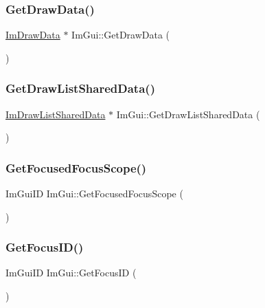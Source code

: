 \subsubsection{\texorpdfstring{Get\+Draw\+Data()}{GetDrawData()}}
{\footnotesize\ttfamily \hyperlink{structImDrawData}{Im\+Draw\+Data} $\ast$ Im\+Gui\+::\+Get\+Draw\+Data (\begin{DoxyParamCaption}{ }\end{DoxyParamCaption})}

\mbox{\label{namespaceImGui_a2a5a77bd5b6215e8cb47a8a457224a52}} 
\subsubsection{\texorpdfstring{Get\+Draw\+List\+Shared\+Data()}{GetDrawListSharedData()}}
{\footnotesize\ttfamily \hyperlink{structImDrawListSharedData}{Im\+Draw\+List\+Shared\+Data} $\ast$ Im\+Gui\+::\+Get\+Draw\+List\+Shared\+Data (\begin{DoxyParamCaption}{ }\end{DoxyParamCaption})}

\mbox{\label{namespaceImGui_a0f0da8910040d826e2e59af4c19a7182}} 
\subsubsection{\texorpdfstring{Get\+Focused\+Focus\+Scope()}{GetFocusedFocusScope()}}
{\footnotesize\ttfamily Im\+Gui\+ID Im\+Gui\+::\+Get\+Focused\+Focus\+Scope (\begin{DoxyParamCaption}{ }\end{DoxyParamCaption})\hspace{0.3cm}{\ttfamily [inline]}}

\mbox{\label{namespaceImGui_a2657245e3c14385d8caf03e06a8b76aa}} 
\subsubsection{\texorpdfstring{Get\+Focus\+I\+D()}{GetFocusID()}}
{\footnotesize\ttfamily Im\+Gui\+ID Im\+Gui\+::\+Get\+Focus\+ID (\begin{DoxyParamCaption}{ }\end{DoxyParamCaption})\hspace{0.3cm}{\ttfamily [inline]}}

